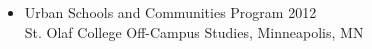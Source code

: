 \documentclass[margin]{res}
\begin{document}
\begin{resume}
\begin{itemize}
\item Urban Schools and Communities Program \hfill 2012 \\
St. Olaf College Off-Campus Studies, Minneapolis, MN \\
\end{itemize}







\end{resume}
\end{document}
